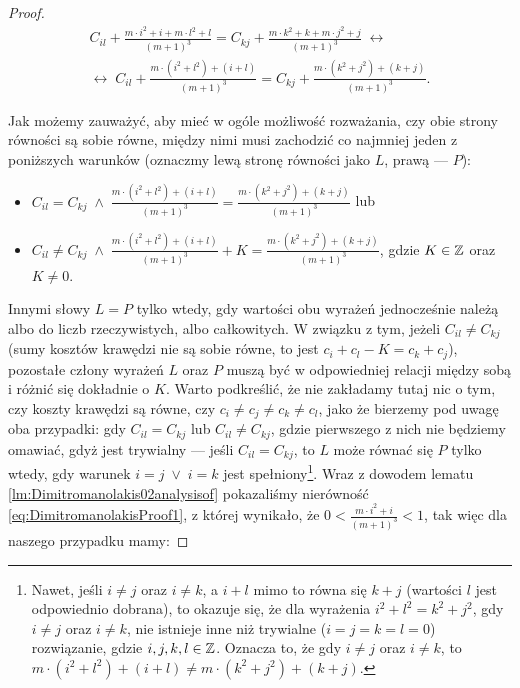 \begin{proof}
	\begin{gather}
		C_{il} + \frac{m \cdot i^{2} + i + m \cdot l^{2} + l}{\left( m + 1 \right)^{3}} = C_{kj} + \frac{m \cdot k^{2} + k + m \cdot j^{2} + j}{\left( m + 1 \right)^{3}} \; \leftrightarrow \\
		\leftrightarrow \; C_{il} + \frac{m \cdot \left( i^{2} + l^{2} \right) + \left( i + l \right)}{\left( m + 1 \right)^{3}} = C_{kj} + \frac{m \cdot \left( k^{2} + j^{2} \right) + \left( k + j \right)}{\left( m + 1 \right)^{3}}\text{.}
	\end{gather}
	
	Jak możemy zauważyć, aby mieć w ogóle możliwość rozważania, czy obie strony równości są sobie równe, między nimi musi zachodzić co najmniej jeden z poniższych warunków (oznaczmy lewą stronę równości jako $L$, prawą --- $P$):
	
	\begin{itemize}
		\item $C_{il} = C_{kj} \; \wedge \; \frac{m \cdot \left( i^{2} + l^{2} \right) + \left( i + l \right)}{\left( m + 1 \right)^{3}} = \frac{m \cdot \left( k^{2} + j^{2} \right) + \left( k + j \right)}{\left( m + 1 \right)^{3}}$ lub
		\item $C_{il} \neq C_{kj} \; \wedge \; \frac{m \cdot \left( i^{2} + l^{2} \right) + \left( i + l \right)}{\left( m + 1 \right)^{3}} + K = \frac{m \cdot \left( k^{2} + j^{2} \right) + \left( k + j \right)}{\left( m + 1 \right)^{3}}$, gdzie $K \in \mathbb{Z}$ oraz $K \neq 0$.
	\end{itemize}
	
	Innymi słowy $L = P$ tylko wtedy, gdy wartości obu wyrażeń jednocześnie należą albo do liczb rzeczywistych, albo całkowitych. W związku z tym, jeżeli $C_{il} \neq C_{kj}$ (sumy kosztów krawędzi nie są sobie równe, to jest $c_{i} + c_{l} - K = c_{k} + c_{j}$), pozostałe człony wyrażeń $L$ oraz $P$ muszą być w odpowiedniej relacji między sobą i różnić się dokładnie o $K$. Warto podkreślić, że nie zakładamy tutaj nic o tym, czy koszty krawędzi są równe, czy $c_{i} \neq c_{j} \neq c_{k} \neq c_{l}$, jako że bierzemy pod uwagę oba przypadki: gdy $C_{il} = C_{kj}$ lub $C_{il} \neq C_{kj}$, gdzie pierwszego z nich nie będziemy omawiać, gdyż jest trywialny --- jeśli $C_{il} = C_{kj}$, to $L$ może równać się $P$ tylko wtedy, gdy warunek $i = j \; \vee \; i = k$ jest spełniony\footnote{Nawet, jeśli $i \neq j$ oraz $i \neq k$, a $i + l$ mimo to równa się $k + j$ (wartości $l$ jest odpowiednio dobrana), to okazuje się, że dla wyrażenia $i^{2} + l^{2} = k^{2} + j^{2}$, gdy $i \neq j$ oraz $i \neq k$, nie istnieje inne niż trywialne ($i = j = k = l = 0$) rozwiązanie, gdzie $i, j, k, l \in \mathbb{Z}$. Oznacza to, że gdy $i \neq j$ oraz $i \neq k$, to $m \cdot \left( i^{2} + l^{2} \right) + \left( i + l \right) \neq m \cdot \left( k^{2} + j^{2} \right) + \left( k + j \right)$.}. Wraz z dowodem lematu \ref{lm:Dimitromanolakis02analysisof} pokazaliśmy nierówność \ref{eq:DimitromanolakisProof1}, z której wynikało, że $0 < \frac{m \cdot i^{2} + i}{\left( m + 1 \right)^{3}} < 1$, tak więc dla naszego przypadku mamy:
	

\end{proof}
